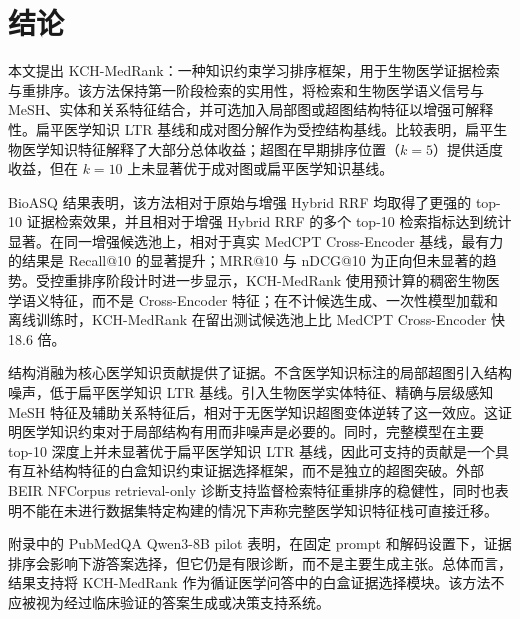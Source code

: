 \section{结论}

本文提出 KCH-MedRank：一种知识约束学习排序框架，用于生物医学证据检索与重排序。该方法保持第一阶段检索的实用性，将检索和生物医学语义信号与 MeSH、实体和关系特征结合，并可选加入局部图或超图结构特征以增强可解释性。扁平医学知识 LTR 基线和成对图分解作为受控结构基线。比较表明，扁平生物医学知识特征解释了大部分总体收益；超图在早期排序位置（$k{=}5$）提供适度收益，但在 $k{=}10$ 上未显著优于成对图或扁平医学知识基线。

BioASQ 结果表明，该方法相对于原始与增强 Hybrid RRF 均取得了更强的 top-10 证据检索效果，并且相对于增强 Hybrid RRF 的多个 top-10 检索指标达到统计显著。在同一增强候选池上，相对于真实 MedCPT Cross-Encoder 基线，最有力的结果是 Recall@10 的显著提升；MRR@10 与 nDCG@10 为正向但未显著的趋势。受控重排序阶段计时进一步显示，KCH-MedRank 使用预计算的稠密生物医学语义特征，而不是 Cross-Encoder 特征；在不计候选生成、一次性模型加载和离线训练时，KCH-MedRank 在留出测试候选池上比 MedCPT Cross-Encoder 快 18.6 倍。

结构消融为核心医学知识贡献提供了证据。不含医学知识标注的局部超图引入结构噪声，低于扁平医学知识 LTR 基线。引入生物医学实体特征、精确与层级感知 MeSH 特征及辅助关系特征后，相对于无医学知识超图变体逆转了这一效应。这证明医学知识约束对于局部结构有用而非噪声是必要的。同时，完整模型在主要 top-10 深度上并未显著优于扁平医学知识 LTR 基线，因此可支持的贡献是一个具有互补结构特征的白盒知识约束证据选择框架，而不是独立的超图突破。外部 BEIR NFCorpus retrieval-only 诊断支持监督检索特征重排序的稳健性，同时也表明不能在未进行数据集特定构建的情况下声称完整医学知识特征栈可直接迁移。

附录中的 PubMedQA Qwen3-8B pilot 表明，在固定 prompt 和解码设置下，证据排序会影响下游答案选择，但它仍是有限诊断，而不是主要生成主张。总体而言，结果支持将 KCH-MedRank 作为循证医学问答中的白盒证据选择模块。该方法不应被视为经过临床验证的答案生成或决策支持系统。
